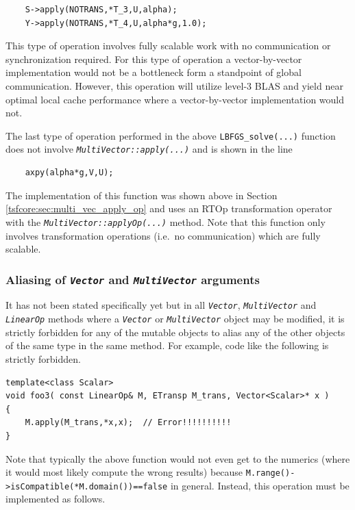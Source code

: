 \documentclass[10pt,fleqn]{article}
\begin{document}
{\scriptsize\begin{verbatim}
    S->apply(NOTRANS,*T_3,U,alpha);
    Y->apply(NOTRANS,*T_4,U,alpha*g,1.0);
\end{verbatim}}

This type of operation involves fully scalable work with no
communication or synchronization required.  For this type of operation
a vector-by-vector implementation would not be a bottleneck form a
standpoint of global communication.  However, this operation will
utilize level-3 BLAS and yield near optimal local cache performance
where a vector-by-vector implementation would not.

The last type of operation performed in the above
\texttt{LBFGS\_solve(...)}  function does not involve
\texttt{\textit{MultiVector\-::apply(...)}} and is shown in the line

{\scriptsize\begin{verbatim}
    axpy(alpha*g,V,U);
\end{verbatim}}

The implementation of this function was shown above in Section
\ref{tsfcore:sec:multi_vec_apply_op} and uses an RTOp transformation
operator with the \texttt{\textit{MultiVector\-::applyOp(...)}}
method.  Note that this function only involves transformation
operations (i.e.~no communication) which are fully scalable.

%
\subsubsection{Aliasing of \texttt{\textit{Vector}} and \texttt{\textit{MultiVector}} arguments}
\label{tsfcore:sec:aliasing}
%

It has not been stated specifically yet but in all
\texttt{\textit{Vector}}, \texttt{\textit{MultiVector}} and
\texttt{\textit{LinearOp}} methods where a \texttt{\textit{Vector}} or
\texttt{\textit{MultiVector}} object may be modified, it is strictly
forbidden for any of the mutable objects to alias any of the other
objects of the same type in the same method.  For example, code like the
following is strictly forbidden.

{\scriptsize\begin{verbatim}
template<class Scalar>
void foo3( const LinearOp& M, ETransp M_trans, Vector<Scalar>* x )
{
    M.apply(M_trans,*x,x);  // Error!!!!!!!!!!
}
\end{verbatim}}

Note that typically the above function would not even get to the numerics
(where it would most likely compute the wrong results) because
\texttt{M.range()->isCompatible(*M.domain())==false} in general.
Instead, this operation must be implemented as follows.
\end{document}
